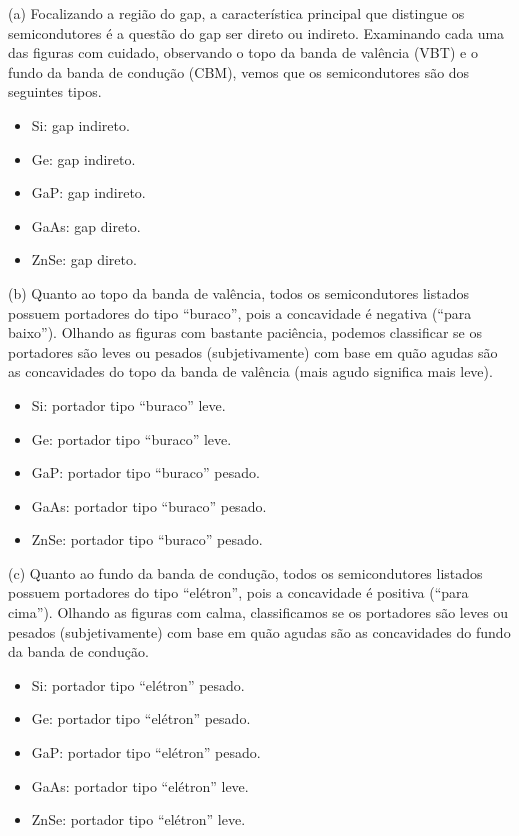 \documentclass[a4paper,10pt]{article}
\begin{document}
(a) Focalizando a região do gap, a característica principal que distingue os semicondutores é a questão do gap ser direto ou indireto. Examinando cada uma das figuras com cuidado, observando o topo da banda de valência (VBT) e o fundo da banda de condução (CBM), vemos que os semicondutores são dos seguintes tipos.

\begin{itemize}
\item Si: gap indireto.
\item Ge: gap indireto.
\item GaP: gap indireto.
\item GaAs: gap direto.
\item ZnSe: gap direto.
\end{itemize}

\n\n

(b) Quanto ao topo da banda de valência, todos os semicondutores listados possuem portadores do tipo ``buraco'', pois a concavidade é negativa (``para baixo''). Olhando as figuras com bastante paciência, podemos classificar se os portadores são leves ou pesados (subjetivamente) com base em quão agudas são as concavidades do topo da banda de valência (mais agudo significa mais leve).

\begin{itemize}
\item Si: portador tipo ``buraco'' leve.
\item Ge: portador tipo ``buraco'' leve.
\item GaP: portador tipo ``buraco'' pesado.
\item GaAs: portador tipo ``buraco'' pesado.
\item ZnSe: portador tipo ``buraco'' pesado.
\end{itemize}

\n\n

(c) Quanto ao fundo da banda de condução, todos os semicondutores listados possuem portadores do tipo ``elétron'', pois a concavidade é positiva (``para cima''). Olhando as figuras com calma, classificamos se os portadores são leves ou pesados (subjetivamente) com base em quão agudas são as concavidades do fundo da banda de condução.

\begin{itemize}
\item Si: portador tipo ``elétron'' pesado.
\item Ge: portador tipo ``elétron'' pesado.
\item GaP: portador tipo ``elétron'' pesado.
\item GaAs: portador tipo ``elétron'' leve.
\item ZnSe: portador tipo ``elétron'' leve.
\end{itemize}
\end{document}

